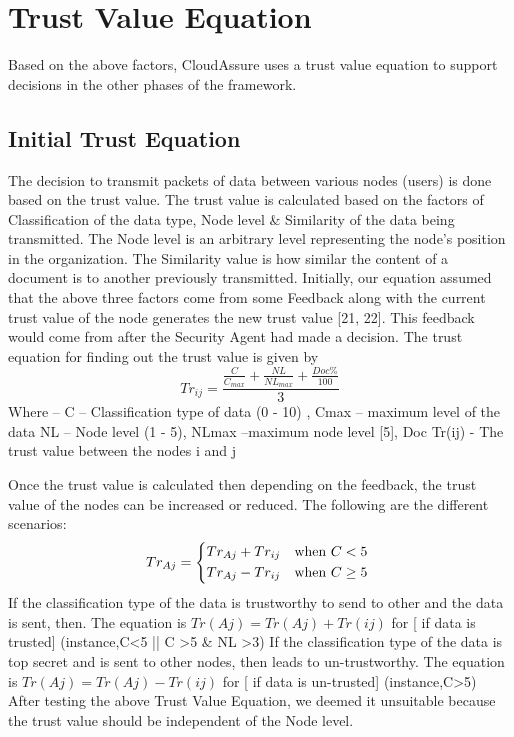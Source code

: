     \section{Trust Value Equation}
Based on the above factors, CloudAssure uses a trust value equation to support decisions in the other phases of the framework. 


\subsection{Initial Trust Equation}
The decision to transmit packets of data between various nodes (users) is done
based on the trust value. The trust value is calculated based on the factors of
Classification of the data type, Node level \& Similarity of the data being transmitted. The Node level is an arbitrary level representing the node's position in the organization. The Similarity value is how similar the content of a document is to another previously transmitted.
Initially, our equation assumed that the above three factors come from some Feedback along with the current trust value of the node generates the new trust value [21, 22]. This feedback would come from after the Security Agent had made a decision. The trust equation for finding out the trust value is given by
\begin{equation}
    Tr_{ij}=\frac{\frac{C}{C_{max}} + \frac{NL}{NL_{max}} + \frac{Doc\%}{100}}{3}
\end{equation}
Where – C – Classification type of data (0 - 10) , Cmax – maximum level of the data
NL – Node level   (1 - 5), NLmax –maximum node level [5], Doc %
Tr(ij)  - The trust value between the nodes i and j

Once the trust value is calculated then depending on the feedback, the trust
value of the nodes can be increased or reduced. The following are the different
scenarios: 
\begin{equation}
   Tr_{Aj} =    \begin{dcases*}
                    Tr_{Aj} + Tr_{ij} & when $C < 5$\\
                    Tr_{Aj} - Tr_{ij} & when $C \ge 5$
                \end{dcases*}
\end{equation}
If the classification type of the data is trustworthy to send to
other and
the data is sent, then. The equation is \(Tr (Aj)=Tr (Aj)+Tr (ij)\) for [ if
    data is trusted] (instance,C<5 || C >5 \& NL >3) If the classification type
    of the data is top secret and is sent to other nodes, then leads to
    un-trustworthy. The equation is \(Tr (Aj)=Tr (Aj)-Tr (ij)\)  for [ if data is
    un-trusted] (instance,C>5)
After testing the above Trust Value Equation, we deemed it unsuitable because the trust value should be independent of the Node level. 



